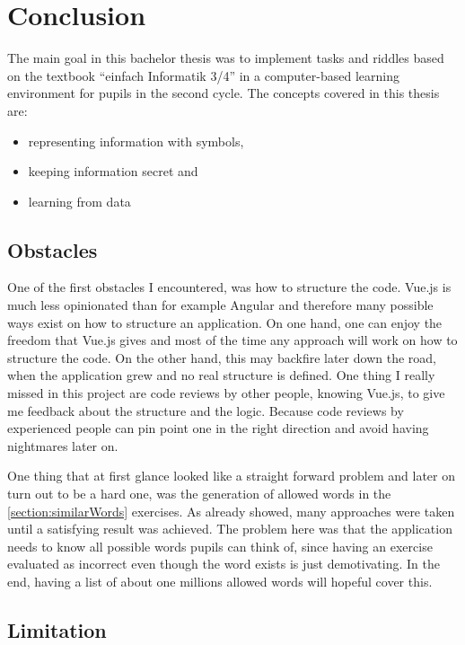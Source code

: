 \chapter{Conclusion}
\label{chapter:conclusion}

The main goal in this bachelor thesis was to implement tasks and riddles based on the textbook “einfach Informatik 3/4” in a computer-based learning environment for pupils in the second cycle. The concepts covered in this thesis are:

\begin{itemize}
    \item representing information with symbols,
    \item keeping information secret and
    \item learning from data
\end{itemize}

\section{Obstacles}
\label{section:obstacles}

One of the first obstacles I encountered, was how to structure the code. Vue.js is much less opinionated than for example Angular and therefore many possible ways exist on how to structure an application. On one hand, one can enjoy the freedom that Vue.js gives and most of the time any approach will work on how to structure the code. On the other hand, this may backfire later down the road, when the application grew and no real structure is defined. One thing I really missed in this project are code reviews by other people, knowing Vue.js, to give me feedback about the structure and the logic. Because code reviews by experienced people can pin point one in the right direction and avoid having nightmares later on.

One thing that at first glance looked like a straight forward problem and later on turn out to be a hard one, was the generation of allowed words in the \ref{section:similarWords} exercises. As already showed, many approaches were taken until a satisfying result was achieved. The problem here was that the application needs to know all possible words pupils can think of, since having an exercise evaluated as incorrect even though the word exists is just demotivating. In the end, having a list of about one millions allowed words will hopeful cover this.

\section{Limitation}
\label{section:limitation}

